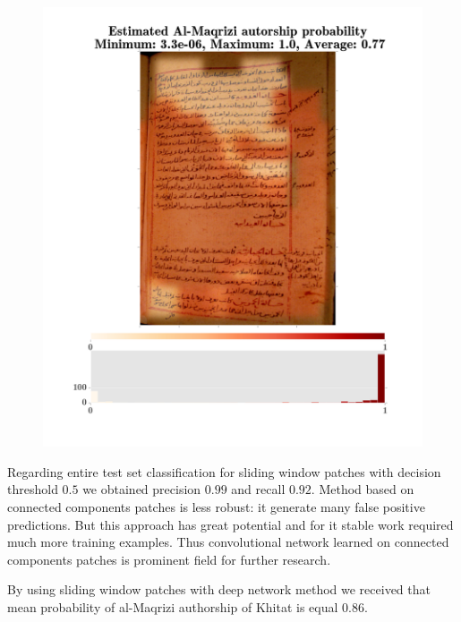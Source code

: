 \documentclass[conference,a4paper,twocolumn]{IEEEtran}
\begin{document}
\begin{figure}
\begin{minipage}{.48\linewidth}
  \includegraphics[width=\linewidth]{figures/hitat_15.png}
\end{minipage}
	\label{fig:al_maqrizi_classification_example}
\end{figure}

Regarding entire test set classification for sliding window patches with decision threshold $0.5$ we obtained precision $0.99$ and recall $0.92$. Method based on connected components patches is less robust: it generate many false positive predictions. But this approach has great potential and for it stable work required much more training examples. Thus convolutional network learned on connected components patches is prominent field for further research.

By using sliding window patches with deep network method we received that mean probability of al-Maqrizi authorship of Khitat is equal $0.86$.    
\end{document}
